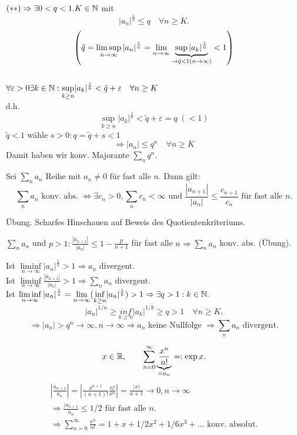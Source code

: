 \documentclass[../ana1.tex]{subfiles}
\begin{document}
\begin{bew}
	\( (**) \Rightarrow \exists 0<q<1. K\in\mathbb{N} \) mit \[ |a_n|^{\frac{1}{n}} \leq q \quad\forall n\geq K. \]
	\[\left(\tilde{q} = \limsup\limits_{n\rightarrow\infty} |a_n|^{\frac{1}{n}} = \lim\limits_{n\rightarrow\infty} \underbrace{\sup |a_k|^{\frac{1}{n}}}_{\rightarrow \tilde{q} < 1 (n \rightarrow \infty)}< 1\right)\]\\
	\(\forall \varepsilon > 0 \exists k \in \mathbb{N}: \underset{k \geq n}{\sup} |a_k|^{\frac{1}{k}} < \tilde{q} + \varepsilon \quad \forall n \geq K \)\\
	d.h.\\
	\[\underset{k \geq n}{\sup} |a_k|^{\frac{1}{k}} < \tilde{q} + \varepsilon = q \; (< 1)\]
	\(\tilde{q} < 1\) wähle \(s > 0: q = \tilde{q} + s < 1\)\\
	\[\Rightarrow |a_n| \leq q^n \quad \forall n \geq K \]
	Damit haben wir konv. Majorante \( \sum_n q^n \).
\end{bew}
\begin{satz}
	Sei \( \sum_n a_n \) Reihe mit \(a_n \neq 0 \) für fast alle \(n\). Dann gilt:
	\[ \sum_n a_n \text{ konv. abs. } \Leftrightarrow \exists c_n > 0, \sum_n c_n < \infty \text{ und } \frac{|a_{n+1}|}{|a_n|} \leq \frac{c_{n+1}}{c_n} \text{ für fast alle }n. \]
\end{satz}
\begin{bew}Übung.
	Scharfes Hinschauen auf Beweis des Quotientenkriteriums.
\end{bew}
\begin{kor}
	\( \sum_n a_n \) und \( p>1: \frac{|a_{n+1}|}{|a_n|} \leq 1 - \frac{p}{n+1} \) für fast alle \(n \Rightarrow \sum_n a_n \) konv. abs. (Übung).
\end{kor}
\begin{bem}
	Ist \( \liminf\limits_{n\rightarrow\infty} |a_n|^{\frac{1}{n}} > 1 \Rightarrow a_n \) divergent.\\
	Ist \( \liminf\limits_{n\rightarrow\infty} \frac{|a_{n+1}|}{|a_n|} > 1 \Rightarrow \sum_n a_n \) divergent.\\
	Ist \( \liminf\limits_{n\rightarrow\infty} |a_n|^{\frac{1}{n}} = \lim\limits_{n\rightarrow\infty}(\underset{k\geq n}{\inf} |a_n|^{\frac{1}{k}}) > 1 \Rightarrow \exists q>1: k \in\mathbb{N}.\)
	\[ |a_n|^{1/n} \geq \underset{k\geq n}{inf} |a_k|^{1/k} \geq q > 1 \quad\forall n\geq K. \]
	\[ \Rightarrow |a_n| > q^n \rightarrow \infty, n\rightarrow\infty \Rightarrow a_n \text{ keine Nullfolge } \Rightarrow \sum_n a_n \text{ divergent}. \]
\end{bem}
\begin{bsp}[Exponentialreihe]
	\[ x\in\mathbb{R},\qquad \sum_{n=0}^{\infty} \underbrace{\frac{x^n}{n!}}_{=a_n} =: \exp x. \]
	\begin{align*}
		|\frac{a_{n+1}}{a_n}| = |\frac{x^{n+1}}{(n+1)!} \frac{n!}{x^n}| = \frac{|x|}{n+1} \rightarrow 0, n\rightarrow\infty\\
		\Rightarrow \frac{|a_{n+1}}{a_n} \leq 1/2 \text{ für fast alle } n.\\
		\Rightarrow \sum_{n=0}^{\infty} \frac{x^n}{n!} = 1 + x + 1/2 x^2 + 1/6 x^3 + \dots \text{ konv. absolut.}
	\end{align*}
\end{bsp}
\end{document}
